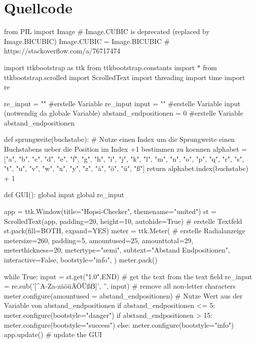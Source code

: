 \documentclass[a4paper,10pt,ngerman]{scrartcl}
\begin{document}
\section{Quellcode}
\begin{python}


from PIL import Image       # Image.CUBIC is deprecated (replaced by Image.BICUBIC)
Image.CUBIC = Image.BICUBIC # https://stackoverflow.com/a/76717474

import ttkbootstrap as ttk
from ttkbootstrap.constants import *
from ttkbootstrap.scrolled import ScrolledText
import threading
import time
import re


re_input = "" #erstelle Variable re_input
input = ""  #erstelle Variable input (notwendig da globale Variable)
abstand_endpositionen = 0 #erstelle Variable abstand_endpositionen


def sprungweite(buchstabe): # Nutze einen Index um die Sprungweite einen Buchstabens ueber die Position im Index +1 bestimmen zu koennen
    alphabet = ["a", "b", "c", "d", "e", "f", "g", "h", "i", "j", "k", "l", "m", "n", "o", "p", "q", "r", "s", "t", "u", "v", "w", "x", "y", "z", "ä", "ö", "ü", "ß"]
    return alphabet.index(buchstabe) + 1





def GUI():
    global input
    global re_input

    app = ttk.Window(title="Hopsi-Checker", themename="united")
    st = ScrolledText(app, padding=20, height=10, autohide=True) # erstelle Textfeld
    st.pack(fill=BOTH, expand=YES)    
    meter = ttk.Meter( # erstelle Radialanzeige
        metersize=260,
        padding=5,
        amountused=25,
        amounttotal=29,
        meterthickness=20,
        metertype="semi",
        subtext="Abstand Endpositionen",
        interactive=False,
        bootstyle="info",
        )
    meter.pack()

    while True:
        input = st.get("1.0",END) # get the text from the text field
        re_input = re.sub('[^A-Za-zäöüÄÖÜßẞ]', '', input) # remove all non-letter characters
        meter.configure(amountused = abstand_endpositionen) # Nutze Wert aus der Variable von abstand_endpositionen
        if abstand_endpositionen <= 5:
            meter.configure(bootstyle="danger")
        if abstand_endpositionen > 15:
            meter.configure(bootstyle="success")
        else:
            meter.configure(bootstyle="info")
        app.update() # update the GUI
        



\end{python}
\end{document}
